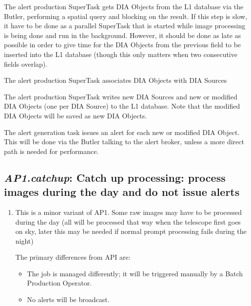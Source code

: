 \documentclass[DM,toc,lsstdraft]{lsstdoc}
\newcommand{\usecase}[3]{%
\subsection{\emph{#1}: #2}
\label{use:#1}
\begin{enumerate}[label=\alph*.]
#3
\end{enumerate}
}
\begin{document}
{\item
The alert production SuperTask gets DIA Objects from the L1 database via the Butler, performing a spatial query and blocking on the result.
If this step is slow, it have to be done as a parallel SuperTask that is started while image processing is being done and run in the background.
However, it should be done as late as possible in order to give time for the DIA Objects from the previous field to be inserted into the L1 database (though this only matters when two consecutive fields overlap).

\item
The alert production SuperTask associates DIA Objects with DIA Sources

\item
The alert production SuperTask writes new DIA Sources and new or modified DIA Objects (one per DIA Source) to the L1 database.
Note that the modified DIA Objects will be saved as new DIA Objects.

\item
The alert generation task issues an alert for each new or modified DIA Object.
This will be done via the Butler talking to the alert broker, unless a more direct path is needed for performance.

}

\usecase{AP1.catchup}{Catch up processing: process images during the day and do not issue alerts}{%

\item
This is a minor variant of AP1.
Some raw images may have to be processed during the day (all will be processed that way when the telescope first goes on sky, later this may be needed if normal prompt processing fails during the night)

The primary differences from API are:
\begin{itemize}
\item The job is managed differently; it will be triggered manually by a Batch Production Operator.
\item No alerts will be broadcast.
\end{itemize}

}
\end{document}
